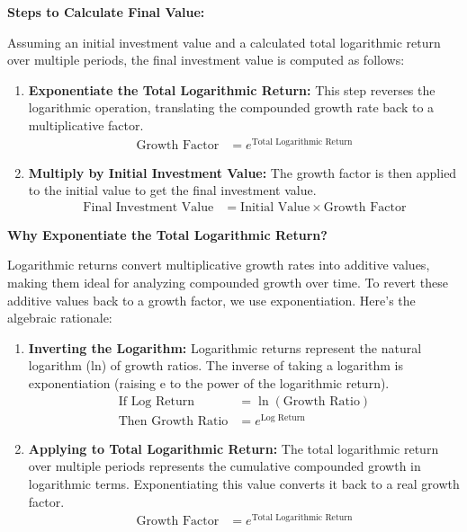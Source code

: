 \documentclass{article}
\begin{document}
\textbf{Steps to Calculate Final Value:}

Assuming an initial investment value and a calculated total logarithmic return over multiple periods, the final investment value is computed as follows:

\begin{enumerate}
    \item \textbf{Exponentiate the Total Logarithmic Return:} This step reverses the logarithmic operation, translating the compounded growth rate back to a multiplicative factor.
    \begin{align*}
        \text{Growth Factor} &= e^{\text{Total Logarithmic Return}}
    \end{align*}
    
    \item \textbf{Multiply by Initial Investment Value:} The growth factor is then applied to the initial value to get the final investment value.
    \begin{align*}
        \text{Final Investment Value} &= \text{Initial Value} \times \text{Growth Factor}
    \end{align*}
\end{enumerate}

\textbf{Why Exponentiate the Total Logarithmic Return?}

Logarithmic returns convert multiplicative growth rates into additive values, making them ideal for analyzing compounded growth over time. To revert these additive values back to a growth factor, we use exponentiation. Here's the algebraic rationale:

\begin{enumerate}
    \item \textbf{Inverting the Logarithm:}
          Logarithmic returns represent the natural logarithm (ln) of growth ratios. The inverse of taking a logarithm is exponentiation (raising e to the power of the logarithmic return).
          \begin{align*}
              \text{If } \text{Log Return} &= \ln(\text{Growth Ratio}) \\
              \text{Then } \text{Growth Ratio} &= e^{\text{Log Return}}
          \end{align*}

    \item \textbf{Applying to Total Logarithmic Return:}
          The total logarithmic return over multiple periods represents the cumulative compounded growth in logarithmic terms. Exponentiating this value converts it back to a real growth factor.
          \begin{align*}
              \text{Growth Factor} &= e^{\text{Total Logarithmic Return}}
          \end{align*}
\end{enumerate}
\end{document}
